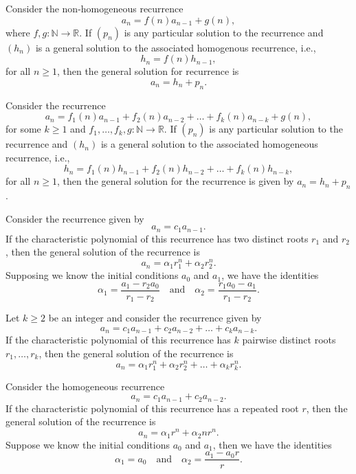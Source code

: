 \documentclass{tufte-handout}
\begin{document}
\begin{Theorem}
    Consider the non-homogeneous recurrence
    \[ a_n = f(n)a_{n-1} + g(n),\]
    where \( f,g: \mathbb{N} \to \mathbb{R} \). If \( (p_n) \) is 
    any particular solution to the recurrence and \( (h_n) \) is a
    general solution to the associated homogenous recurrence, i.e.,
    \[ h_n = f(n)h_{n-1},\]
    for all \( n \geq 1 \), then the general solution
    for recurrence is
    \[ a_n = h_n + p_n.\]
\end{Theorem}

\begin{Theorem}
    Consider the recurrence
    \[a_n = f_1(n)a_{n-1} + f_2(n)a_{n-2} + \dots +
    f_k(n)a_{n-k} + g(n),\]
    for some \( k \geq 1 \) and \( f_1, \ldots, f_k, g: \mathbb{N} \to \mathbb{R} \).
    If \( (p_n) \) is any particular solution to the recurrence
    and \( (h_n) \) is a general solution to the
    associated homogeneous recurrence, i.e.,
    \[ h_n = f_1(n)h_{n-1} + f_2(n)h_{n-2} + \dots + f_k(n)h_{n-k},\]
    for all \( n \geq 1 \), then the general solution for the recurrence is
    given by \( a_n = h_n + p_n \).
\end{Theorem}

\begin{Theorem}
    Consider the recurrence given by
    \[ a_n = c_1a_{n-1}.\]
    If the characteristic polynomial of this recurrence has two
    distinct roots \( r_1 \) and \( r_2 \), then the general solution
    of the recurrence is
    \[ a_n = \alpha_1r_1^n + \alpha_2r_2^n.\]
    Supposing we know the initial conditions \( a_0 \) and \( a_1 \),
    we have the identities
    \[\alpha_1 = \frac{a_1 - r_2a_0}{r_1 - r_2} 
    \quad \text{and} \quad \alpha_2 = \frac{r_1a_0 - a_1}{r_1 - r_2}.\]
\end{Theorem}

\begin{Theorem}
    Let \( k \geq 2 \) be an integer and consider the recurrence given by
    \[ a_n = c_1a_{n-1} + c_2a_{n-2} + \dots + c_ka_{n-k}.\]
    If the characteristic polynomial of this recurrence has \( k \) pairwise distinct roots
    \( r_1, \ldots, r_k \), then the general solution of the recurrence is
    \[ a_n = \alpha_1r_1^n + \alpha_2r_2^n + \dots + \alpha_kr_k^n.\]
\end{Theorem}

\begin{Theorem}
    Consider the homogeneous recurrence
    \[ a_n = c_1a_{n-1} + c_2a_{n-2}.\]
    If the characteristic polynomial of this recurrence has 
    a repeated root \( r \), then the general solution of
    the recurrence is
    \[ a_n = \alpha_1r^n + \alpha_2nr^n.\]
    Suppose we know the initial conditions \( a_0 \) and \( a_1 \),
    then we have the identities
    \[\alpha_1 = a_0 \quad \text{and} \quad \alpha_2 = \frac{a_1 - a_0r}{r}.\]
\end{Theorem}
\end{document}
